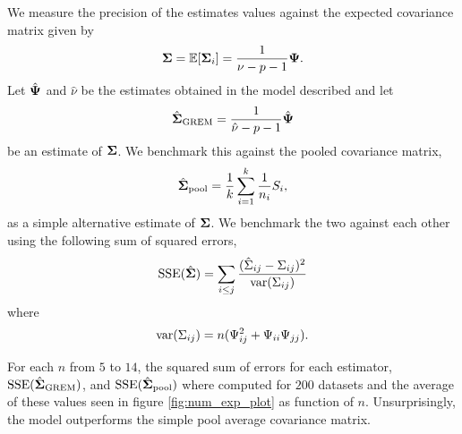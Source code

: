 \documentclass{article}\usepackage[]{graphicx}\usepackage[]{color}
\begin{document}
We measure the precision of the estimates values against the expected covariance matrix given by
\begin{align*}
  {\boldsymbol{\Sigma}} = \mathbb{E}[{\boldsymbol{\Sigma}}_i] = \frac{1}{\nu - p - 1}{\boldsymbol{\Psi}}.
\end{align*}
Let ${\hat{\boldsymbol{\Psi}}}$ and $\hat{\nu}$ be the estimates obtained in the model described and let
\begin{align*}
  \hat{{\boldsymbol{\Sigma}}}_\text{GREM} = \frac{1}{\hat{\nu} - p - 1}{\hat{\boldsymbol{\Psi}}}
\end{align*}
be an estimate of ${\boldsymbol{\Sigma}}$. We benchmark this against the pooled covariance matrix,
\begin{align*}
  {\hat{\boldsymbol{\Sigma}}}_\text{pool}
    = \frac{1}{k} \sum_{i = 1}^k \frac{1}{n_i} S_i,
\end{align*}
as a simple alternative estimate of ${\boldsymbol{\Sigma}}$.
We benchmark the two against each other using the following sum of squared errors,
\begin{align*}
  \text{SSE}({\hat{\boldsymbol{\Sigma}}}) = \sum_{i \leq j} \frac{(\hat{\Sigma}_{ij}- \Sigma_{ij})^2}{\text{var}(\Sigma_{ij})}
\end{align*}
where
\begin{align*}
 \text{var}(\Sigma_{ij}) = n(\Psi_{ij}^2 + \Psi_{ii}\Psi_{jj}).
\end{align*}

For each $n$ from $5$ to $14$, the squared sum of errors for each estimator, $\text{SSE}({\hat{\boldsymbol{\Sigma}}}_\text{GREM})$, and $\text{SSE}({\hat{\boldsymbol{\Sigma}}}_\text{pool})$ where computed for $200$ datasets and the average of these values seen in figure \ref{fig:num_exp_plot} as function of $n$.
Unsurprisingly, the model outperforms the simple pool average covariance matrix.
\end{document}
